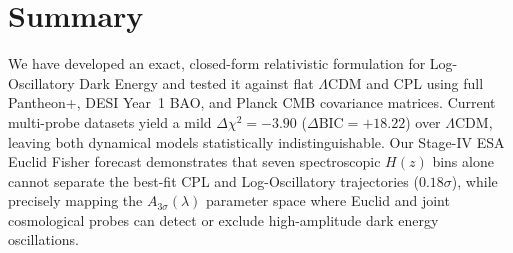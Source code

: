\section{Summary}
We have developed an exact, closed-form relativistic formulation for Log-Oscillatory Dark Energy and tested it against flat $\Lambda\mathrm{CDM}$ and CPL using full Pantheon+, DESI Year~1 BAO, and Planck CMB covariance matrices. Current multi-probe datasets yield a mild $\Delta\chi^2 = -3.90$ ($\Delta\mathrm{BIC} = +18.22$) over $\Lambda\mathrm{CDM}$, leaving both dynamical models statistically indistinguishable. Our Stage-IV ESA Euclid Fisher forecast demonstrates that seven spectroscopic $H(z)$ bins alone cannot separate the best-fit CPL and Log-Oscillatory trajectories ($0.18\sigma$), while precisely mapping the $A_{3\sigma}(\lambda)$ parameter space where Euclid and joint cosmological probes can detect or exclude high-amplitude dark energy oscillations.
